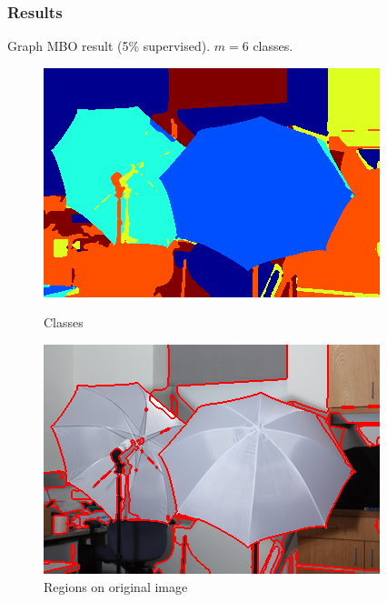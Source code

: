 \documentclass{beamer}
\begin{document}
\begin{frame}
  \frametitle{Results}
  Graph MBO result (5\% supervised). $m = 6$ classes.
  \begin{figure}[ht]
    \begin{minipage}[b]{0.45\linewidth}
      \centering
      \includegraphics[width=\textwidth]{./Images/Umbrella/MBO/classification.png}
      \caption{Classes}
    \end{minipage}
    \begin{minipage}[b]{0.45\linewidth}
      \centering
      \includegraphics[width=\textwidth]{./Images/Umbrella/MBO/imWithBorders.png}
      \caption{Regions on original image}
    \end{minipage}
  \end{figure}
\end{frame}

\end{document}
